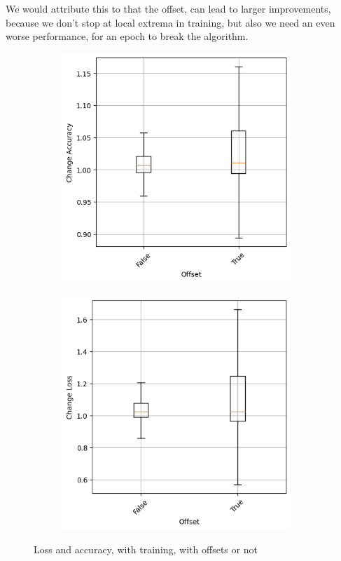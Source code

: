 We would attribute this to that the offset, can lead to larger improvements, because we don't stop at local extrema in training, but also we need an even worse performance, for an epoch to break the algorithm.
\begin{figure}
    \begin{subfigure}{0.5\textwidth}
        \centering
        \includegraphics[width=0.95\textwidth]{plots/Offset_Trained_accuracy.png}
    \end{subfigure}
    \begin{subfigure}{0.5\textwidth}
        \centering
        \includegraphics[width=0.95\textwidth]{plots/Offset_Trained_loss.png}
    \end{subfigure}
    \caption{Loss and accuracy, with training, with offsets or not}
    \label{fig:offset-training}
\end{figure}
